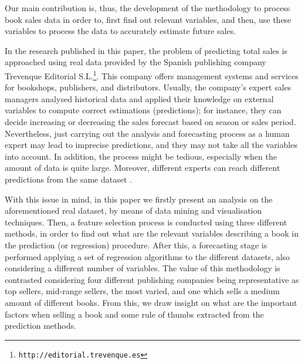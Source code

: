 \documentclass[a4paper,10pt,twocolumn,preprint,3p]{elsarticle}
\begin{document}
Our main contribution is, thus, the development of the methodology to process book sales data in order to, first find out
relevant variables, and then, use these variables to process the data to accurately estimate future sales.


In the research published in this paper, the problem of predicting total sales is approached using real data provided by the 
Spanish publishing company Trevenque Editorial S.L.\footnote{{\tt http://editorial.trevenque.es}}. This company offers management systems and services for bookshops, publishers, and distributors. 
Usually, the company's expert sales managers analysed historical data
and applied their knowledge on external variables to compute correct
estimations (predictions); for instance, they can decide increasing or
decreasing the sales forecast based on season or sales period. 
Nevertheless, just carrying out the analysis and forecasting process
as a human expert may lead to imprecise predictions, and they may not
take all the variables into account.  
In addition, the process might be tedious, especially when the amount
of data is quite large. Moreover, different experts can reach different
predictions from the same dataset \cite{Sanders1994}. 


With this issue in mind, in this paper we firstly present an analysis
on the aforementioned real dataset, by means of data mining and
visualisation techniques. Then, a feature selection process is
conducted using three different methods, in order to find out what are
the relevant variables describing a book in the prediction (or
regression) procedure. After this, a forecasting stage is performed
applying a set of regression algorithms to the different datasets,
also considering a different number of variables. 
The value of this methodology is contrasted considering four different
publishing companies being representative as top sellers, mid-range
sellers, the most varied, and one which sells a medium amount of
different books. From this, we draw insight on what are the important
factors when selling a book and some rule of thumbs extracted from the
prediction methods.
\end{document}
